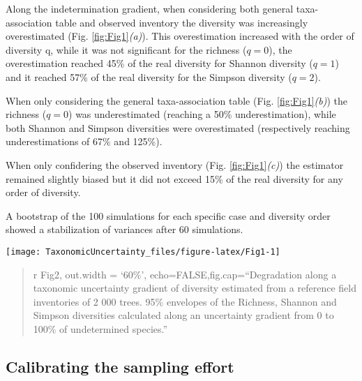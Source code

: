 \documentclass[fleqn,10pt]{ArtEcoFoG} %
\begin{document}
Along the indetermination gradient, when considering both general
taxa-association table and observed inventory the diversity was
increasingly overestimated (Fig. \ref{fig:Fig1}\emph{(a)}). This
overestimation increased with the order of diversity q, while it was not
significant for the richness (\(q=0\)), the overestimation reached 45\%
of the real diversity for Shannon diversity (\(q = 1\)) and it reached
57\% of the real diversity for the Simpson diversity (\(q = 2\)).

When only considering the general taxa-association table (Fig.
\ref{fig:Fig1}\emph{(b)}) the richness (\(q=0\)) was underestimated
(reaching a 50\% underestimation), while both Shannon and Simpson
diversities were overestimated (respectively reaching underestimations
of 67\% and 125\%).

When only confidering the observed inventory (Fig.
\ref{fig:Fig1}\emph{(c)}) the estimator remained slightly biased but it
did not exceed 15\% of the real diversity for any order of diversity.

A bootstrap of the 100 simulations for each specific case and diversity
order showed a stabilization of variances after 60 simulations.

\begin{figure*}
\texttt{[image: TaxonomicUncertainty\_files/figure-latex/Fig1-1]} \caption{Indices degradation along a taxonomic uncertainty gradient. 95\% envelopes of the Richness, Shannon and Simpson indices calculated through our propagation method along an uncertainty gradient from 0 to 100\% of undetermined species. In (a) Only expert prior is considered to compute the association frequencies, in (b) both expert and observation prior are equally accounted for in the propagation method and in (c) only the observation prior is considered.}\label{fig:Fig1}
\end{figure*}

\begin{quote}
r Fig2, out.width = `60\%', echo=FALSE,fig.cap=``Degradation along a
taxonomic uncertainty gradient of diversity estimated from a reference
field inventories of 2 000 trees. 95\% envelopes of the Richness,
Shannon and Simpson diversities calculated along an uncertainty gradient
from 0 to 100\% of undetermined species.''
\end{quote}

\subsection{Calibrating the sampling
effort}\label{calibrating-the-sampling-effort}
\end{document}
